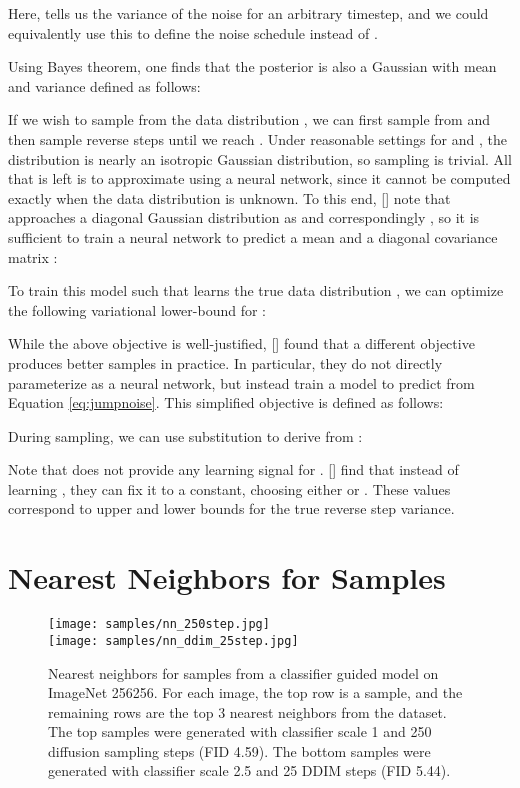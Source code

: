 \documentclass{article}
\newcommand{\namecite}[1]{\citeauthor{#1} [\citenum{#1}]}
\begin{document}
Here,  tells us the variance of the noise for an arbitrary timestep, and we could equivalently use this to define the noise schedule instead of .

Using Bayes theorem, one finds that the posterior  is also a Gaussian with mean  and variance  defined as follows:



If we wish to sample from the data distribution , we can first sample from  and then sample reverse steps  until we reach . Under reasonable settings for  and , the distribution  is nearly an isotropic Gaussian distribution, so sampling  is trivial. All that is left is to approximate  using a neural network, since it cannot be computed exactly when the data distribution is unknown. To this end, \namecite{dickstein} note that  approaches a diagonal Gaussian distribution as  and correspondingly , so it is sufficient to train a neural network to predict a mean  and a diagonal covariance matrix :


To train this model such that  learns the true data distribution , we can optimize the following variational lower-bound  for :


While the above objective is well-justified, \namecite{ddpm} found that a different objective produces better samples in practice. In particular, they do not directly parameterize  as a neural network, but instead train a model  to predict  from Equation \ref{eq:jumpnoise}. This simplified objective is defined as follows:


During sampling, we can use substitution to derive  from :


Note that  does not provide any learning signal for . \namecite{ddpm} find that instead of learning , they can fix it to a constant, choosing either  or . These values correspond to upper and lower bounds for the true reverse step variance.
\section{Nearest Neighbors for Samples}
\label{app:neighbors}
\begin{figure}[h]
    \begin{center}
    \texttt{[image: samples/nn\_250step.jpg]} \\
    \vspace{0.3cm}
    \texttt{[image: samples/nn\_ddim\_25step.jpg]}
    
    \caption{\label{fig:neighbors} Nearest neighbors for samples from a classifier guided model on ImageNet 256256. For each image, the top row is a sample, and the remaining rows are the top 3 nearest neighbors from the dataset. The top samples were generated with classifier scale 1 and 250 diffusion sampling steps (FID 4.59). The bottom samples were generated with classifier scale 2.5 and 25 DDIM steps (FID 5.44).}
    \end{center}
\end{figure}
\end{document}
